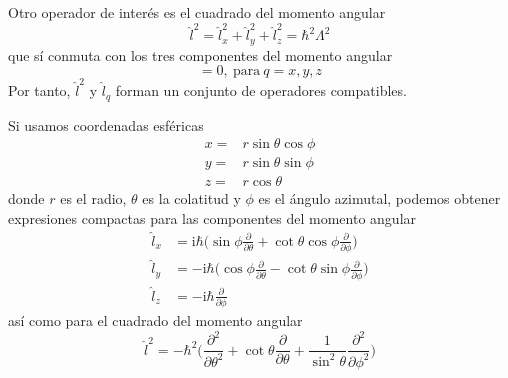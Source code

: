 Otro operador de interés es el cuadrado del momento angular
\begin{equation}
    \hat{l}^2=\hat{l}_x^2+\hat{l}_y^2+\hat{l}_z^2=
    \hbar^2\Lambda^2
\end{equation}
que sí conmuta con los tres componentes del momento angular
\begin{equation}
    [ \hat{l}^2,  \hat{l}_q] = 0,\mathrm{~ para~}q=x, y, z
\end{equation}
Por tanto, $\hat{l}^2$ y $\hat{l}_q$ forman un conjunto de 
operadores compatibles.

Si usamos coordenadas esféricas 
\begin{subequations}
\begin{align}
    x=&r\sin\theta\cos\phi\\
    y=&r\sin\theta\sin\phi\\
    z=&r\cos\theta
\end{align}
\end{subequations}
donde $r$ es el radio, $\theta$ es la colatitud y 
$\phi$ es el ángulo azimutal, podemos obtener expresiones
compactas para las componentes del momento angular
\begin{subequations}
    \begin{align}
        \hat{l}_x&= 
        \mathrm{i}\hbar\bigg(
        \sin{\phi}\frac{\partial}{\partial \theta} +
        \cot{\theta}\cos{\phi} \frac{\partial}{\partial\phi}
        \bigg) \\
        \hat{l}_y&= 
        -\mathrm{i}\hbar\bigg(
        \cos{\phi}\frac{\partial}{\partial \theta} -
        \cot{\theta}\sin{\phi} \frac{\partial}{\partial\phi}
        \bigg) \\
        \hat{l}_z&=  -\mathrm{i}\hbar\frac{\partial}{\partial \phi}
    \end{align}\label{eq:lz}
\end{subequations}
así como para el cuadrado del momento angular
\begin{equation}
    \hat{l}^2= -\hbar^2\bigg(
    \frac{\partial^2}{\partial \theta^2} +
        \cot{\theta}\frac{\partial}{\partial \theta} + 
        \frac{1}{\sin^2\theta}\frac{\partial^2}{\partial\phi^2}
        \bigg)
\end{equation}

